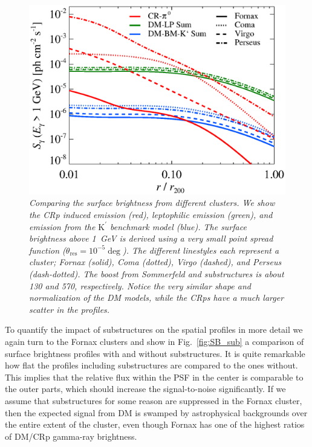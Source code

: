 \documentclass[10pt,aps,pra,reprint,amsmath,amsfonts,amssymb,showpacs]{revtex4-1}
\newcommand{\rmn}{\mathrm}
\newcommand{\psf}{\theta_\rmn{res}}
\newcommand{\Kp}{\rmn{K}^\prime}
\begin{document}
\begin{figure}
 \includegraphics[width=0.99\columnwidth]{figures/SB.v10.1GeV.SF300.SubMass.elmu.eps}
\caption{\it Comparing the surface brightness from different
  clusters. We show the CRp induced emission (red), leptophilic
  emission (green), and emission from the $\Kp$ benchmark model
  (blue). The surface brightness above 1~GeV is derived using a very
  small point spread function ($\psf=10^{-5}\deg$). The
  different linestyles each represent a cluster; Fornax (solid), Coma
  (dotted), Virgo (dashed), and Perseus (dash-dotted). The boost from
  Sommerfeld and substructures is about 130 and 570,
  respectively. Notice the very similar shape and normalization of the DM
  models, while the CRps have a much larger scatter in the profiles.}
 \label{fig:SB_clu}
\end{figure}

To quantify the impact of substructures on the spatial profiles in
more detail we again turn to the Fornax clusters and show in
Fig.~\ref{fig:SB_sub} a comparison of surface brightness profiles with
and without substructures. It is quite remarkable how flat the
profiles including substructures are compared to the ones
without. This implies that the relative flux within the PSF in the
center is comparable to the outer parts, which should increase the
signal-to-noise significantly. If we assume that substructures for
some reason are suppressed in the Fornax cluster, then the expected
signal from DM is swamped by astrophysical backgrounds over the entire
extent of the cluster, even though Fornax has one of the highest
ratios of DM/CRp gamma-ray brightness.
\end{document}
